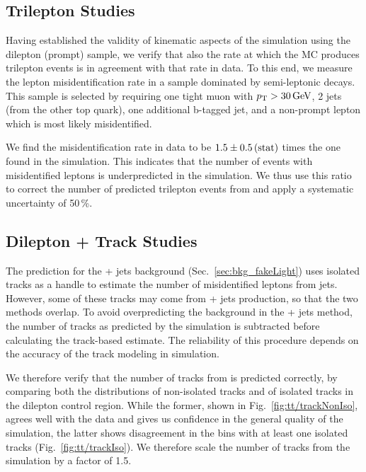 \subsection{Trilepton Studies}
\label{sec:bkg_tt/trilepton}

Having established the validity of kinematic aspects of the \ttbar simulation using the dilepton (prompt) sample, we verify that also the rate at which the \ttbar MC produces trilepton events is in agreement with that rate in data. To this end, we measure the lepton misidentification rate in a sample dominated by semi-leptonic \ttbar decays. This sample is selected by requiring one tight muon with $p_{\mathrm{T}} > 30\,\text{Ge\hspace{-.08em}V}$, 2 jets (from the other top quark), one additional b-tagged jet, and a non-prompt lepton which is most likely misidentified.

We find the \ttbar misidentification rate in data to be $1.5 \pm 0.5\,\text{(stat)}$ times the one found in the \ttbar simulation. This indicates that the number of events with misidentified leptons is underpredicted in the \ttbar simulation. We thus use this ratio to correct the number of predicted trilepton events from \ttbar and apply a systematic uncertainty of 50\,\%.

\subsection{Dilepton + Track Studies}
\label{sec:bkg_tt/dilepton+track}

The prediction for the \Z + jets background (Sec.~\ref{sec:bkg_fakeLight}) uses isolated tracks as a handle to estimate the number of misidentified leptons from jets. However, some of these tracks may come from \ttbar + jets production, so that the two methods overlap. To avoid overpredicting the background in the \Z + jets method, the number of tracks as predicted by the \ttbar simulation is subtracted before calculating the track-based estimate. The reliability of this procedure depends on the accuracy of the track modeling in simulation.

We therefore verify that the number of tracks from \ttbar is predicted correctly, by comparing both the distributions of non-isolated tracks and of isolated tracks in the dilepton control region. While the former, shown in Fig.~\ref{fig:tt/trackNonIso}, agrees well with the data and gives us confidence in the general quality of the simulation, the latter shows disagreement in the bins with at least one isolated tracks (Fig.~\ref{fig:tt/trackIso}). We therefore scale the number of tracks from the \ttbar simulation by a factor of 1.5.

